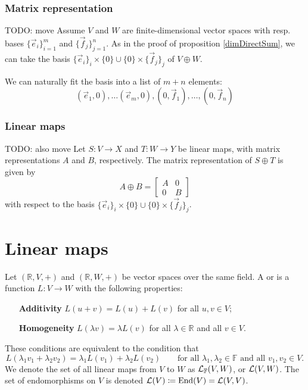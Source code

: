\subsubsection{Matrix representation}
TODO: move
Assume $V$ and $W$ are finite-dimensional vector spaces with resp. bases $\{\vec{e}_i\}_{i=1}^m$ and $\{\vec{f}_j\}_{j=1}^n$.
As in the proof of proposition \ref{dimDirectSum}, we can take the basis $\{\vec{e}_i\}_i\times\{0\} \cup \{0\}\times\{\vec{f}_j\}_j$ of $V\oplus W$.

We can naturally fit the basis into a list of $m+n$ elements:
\[ (\vec{e}_1,0),\ldots (\vec{e}_m, 0), (0, \vec{f}_1), \ldots, (0,\vec{f}_n)  \]
\subsubsection{Linear maps}
TODO: also move
Let $S: V\to X$ and $T:W\to Y$ be linear maps, with matrix representations $A$ and $B$, respectively. The matrix representation of $S\oplus T$ is given by
\[ A\oplus B = \begin{bmatrix}
A & 0 \\
0 & B
\end{bmatrix} \]
with respect to the basis $\{\vec{e}_i\}_i\times\{0\} \cup \{0\}\times\{\vec{f}_j\}_j$.

\section{Linear maps}
\begin{definition}
Let $(\mathbb{R}, V, +)$ and $(\mathbb{R}, W, +)$ be vector spaces over the same field. A  or  is a function $L:V\to W$ with the following properties:
\begin{itemize}[leftmargin=3cm]
\item[\textbf{Additivity}] $L(u+v) = L(u)+L(v)$ for all $u,v \in V$;
\item[\textbf{Homogeneity}] $L(\lambda v) = \lambda L(v)$ for all $\lambda \in \mathbb{R}$ and all $v\in V$.
\end{itemize}
These conditions are equivalent to the condition that
\[ L(\lambda_1 v_1 + \lambda_2v_2) = \lambda_1L(v_1) + \lambda_2 L(v_2) \qquad \text{for all $\lambda_1,\lambda_2\in \mathbb{F}$ and all $v_1,v_2\in V$.} \]
We denote the set of all linear maps from $V$ to $W$ as $\operatorname{\mathcal{L}}_\mathbb{F}(V,W)$, or $\operatorname{\mathcal{L}}(V,W)$. The set of endomorphisms on $V$ is denoted $\operatorname{\mathcal{L}}(V) \coloneqq \operatorname{End}(V) = \operatorname{\mathcal{L}}(V,V)$.
\end{definition}

